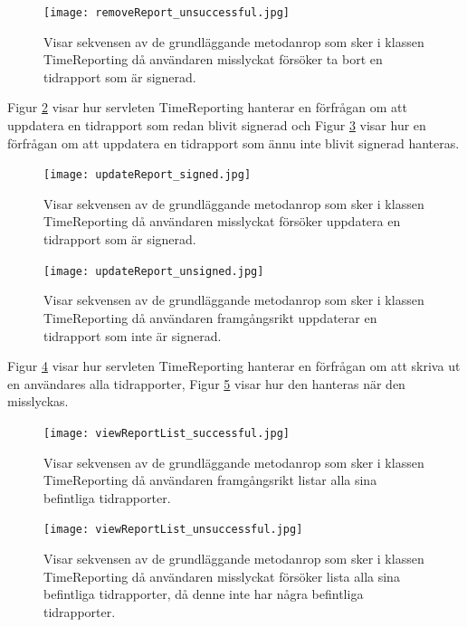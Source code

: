 \documentclass[a4paper]{article}
\begin{document}
\begin{figure}[h!]
\centering
\texttt{[image: removeReport\_unsuccessful.jpg]}
\caption{Visar sekvensen av de grundläggande metodanrop som sker i klassen TimeReporting då användaren misslyckat försöker ta bort en tidrapport som är signerad.
\label{removeReportFail}}
\end{figure}

\noindent
Figur \ref{updateReportSigned} visar hur servleten TimeReporting hanterar en förfrågan om att uppdatera en tidrapport som redan blivit signerad och Figur \ref{updateReportUnsigned} visar hur en förfrågan om att uppdatera en tidrapport som ännu inte blivit signerad hanteras.

\begin{figure}[h!]
\centering
\texttt{[image: updateReport\_signed.jpg]}
\caption{Visar sekvensen av de grundläggande metodanrop som sker i klassen TimeReporting då användaren misslyckat försöker uppdatera en tidrapport som är signerad.
\label{updateReportSigned}}
\end{figure}

\begin{figure}[h!]
\centering
\texttt{[image: updateReport\_unsigned.jpg]}
\caption{Visar sekvensen av de grundläggande metodanrop som sker i klassen TimeReporting då användaren framgångsrikt uppdaterar en tidrapport som inte är signerad.
\label{updateReportUnsigned}}
\end{figure}

\noindent
Figur \ref{viewReportList} visar hur servleten TimeReporting hanterar en förfrågan om att skriva ut en användares alla tidrapporter, Figur \ref{viewReportListFail} visar hur den hanteras när den misslyckas.

\begin{figure}[h!]
\centering
\texttt{[image: viewReportList\_successful.jpg]}
\caption{Visar sekvensen av de grundläggande metodanrop som sker i klassen TimeReporting då användaren framgångsrikt listar alla sina befintliga tidrapporter.
\label{viewReportList}}
\end{figure}

\begin{figure}[h!]
\centering
\texttt{[image: viewReportList\_unsuccessful.jpg]}
\caption{Visar sekvensen av de grundläggande metodanrop som sker i klassen TimeReporting då användaren misslyckat försöker lista alla sina befintliga tidrapporter, då denne inte har några befintliga tidrapporter.
\label{viewReportListFail}}
\end{figure}
\end{document}
